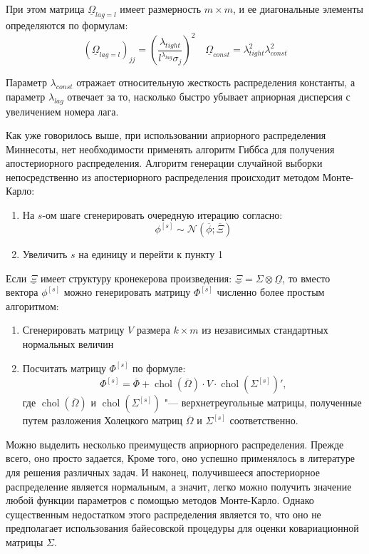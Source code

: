 \documentclass[11pt]{article} %
\DeclareMathOperator{\chol}{chol}
\newcommand{\cN}{\mathcal{N}}
\newcommand{\prior}{\underline}
\newcommand{\post}{\overline}
\begin{document}
При этом матрица $\prior \Omega_{lag=l}$ имеет размерность $m\times m$, и ее диагональные элементы определяются по формулам:
\begin{equation}
(\prior \Omega_{lag=l})_{jj} \label{prior_omega2}
=\left(\frac{\lambda_{tight}}{l^{\lambda_{lag}}\sigma_j}\right)^2
\quad
\prior \Omega_{const}=\lambda_{tight}^2\lambda_{const}^2
\end{equation}

Параметр $\lambda_{const}$ отражает относительную жесткость распределения константы, а параметр $\lambda_{lag}$ отвечает за то, насколько быстро убывает априорная дисперсия с увеличением номера лага.

Как уже говорилось выше, при использовании априорного распределения Миннесоты, нет необходимости применять алгоритм Гиббса для получения апостериорного распределения. Алгоритм генерации случайной выборки непосредственно из апостериорного распределения происходит методом Монте-Карло: \label{alg:alg1}
\begin{enumerate}
\item На $s$-ом шаге сгенерировать очередную итерацию согласно:
\begin{equation}
\phi^{[s]}\sim \cN(\post \phi; \post \Xi)
\end{equation}
\item Увеличить $s$ на единицу и перейти к пункту 1
\end{enumerate}

Если $\prior \Xi$ имеет структуру кронекерова произведения: $\prior \Xi = \Sigma \otimes \prior \Omega$, то вместо вектора $\phi^{[s]}$ можно генерировать матрицу $\Phi^{[s]}$ численно более простым алгоритмом:


\begin{enumerate}
\item Сгенерировать матрицу $V$ размера $k\times m$  из независимых стандартных нормальных величин
\item Посчитать матрицу $\Phi^{[s]}$ по формуле:
\begin{equation}
\Phi^{[s]} = \post \Phi + \chol(\post\Omega) \cdot V \cdot \chol(\Sigma^{[s]})',
\end{equation}
где $\chol(\post\Omega)$ и  $\chol(\Sigma^{[s]})$ "--- верхнетреугольные матрицы, полученные путем разложения Холецкого матриц $\post\Omega$ и $\Sigma^{[s]}$ соответственно.
\end{enumerate}

Можно выделить несколько преимуществ априорного распределения. Прежде всего, оно просто задается, Кроме того, оно успешно применялось в литературе для решения различных задач. И наконец, получившееся апостериорное распределение является нормальным, а значит, легко можно получить значение любой функции параметров с помощью методов Монте-Карло. Однако существенным недостатком этого распределения является то, что оно не предполагает использования байесовской процедуры для оценки ковариационной матрицы $\Sigma$.
\end{document}

